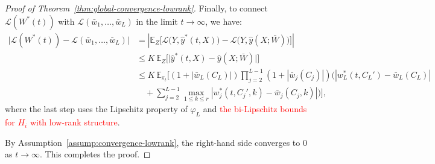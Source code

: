 \documentclass[11pt]{article}
\newcommand{\E}{\mathbb{E}}
\newcommand{\1}{\mathbbm{1}}
\begin{document}
\begin{proof}[Proof of Theorem~\ref{thm:global-convergence-lowrank}]
Finally, to connect $\mathscr{L}(W^*(t))$ with $\mathscr{L}(\bar{w}_1,\ldots,\bar{w}_L)$ in the limit $t\to\infty$, we have:
\begin{align*}
\big|\mathscr{L}(W^*(t))-\mathscr{L}(\bar{w}_1,\ldots,\bar{w}_L)\big| &= \left|\E_Z\big[\mathcal{L}\big(Y,\hat y^*(t,X)\big)-\mathcal{L}\big(Y,\hat y(X;\bar{W})\big)\big]\right|\\
&\le K\,\E_Z\big[\big|\hat y^*(t,X)-\hat y(X;\bar{W})\big|\big]\\
&\le K\,\E_{\pi_t}\Big[(1+|\bar{w}_L(C_L)|)\prod_{j=2}^{L-1}(1+|\bar{w}_j(C_j)|)\Big(|w_L^*(t,C_L')-\bar{w}_L(C_L)|\\
&\quad + \sum_{j=2}^{L-1}\max_{1\le k\le r}|w_j^*(t,C_j',k)-\bar{w}_j(C_j,k)|\Big)\Big],
\end{align*}
where the last step uses the Lipschitz property of $\varphi_L$ and \textcolor{red}{the bi-Lipschitz bounds for $H_i$ with low-rank structure}.

By Assumption~\ref{assump:convergence-lowrank}, the right-hand side converges to $0$ as $t\to\infty$. This completes the proof.
\end{proof}
\end{document}
